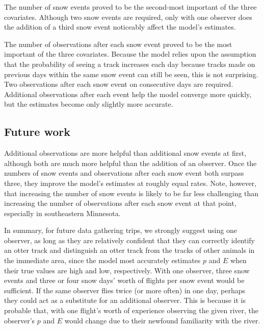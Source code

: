 \documentclass[12pt]{article}
\begin{document}
    The number of snow events proved to be the second-most important of the
    three covariates. Although two snow events are required, only with one
    observer does the addition of a third snow event noticeably affect the
    model's estimates.

    The number of observations after each snow event proved to be the most
    important of the three covariates. Because the model relies upon the
    assumption that the probability of seeing a track increases each day because
    tracks made on previous days within the same snow event can still be seen,
    this is not surprising. Two observations after each snow event on
    consecutive days are required. Additional observations after each event help
    the model converge more quickly, but the estimates become only slightly more
    accurate.

    \subsection{Future work}
    Additional observations are more helpful than additional snow events at
    first, although both are much more helpful than the addition of an observer.
    Once the numbers of snow events and observations after each snow event both
    surpass three, they improve the model's estimates at roughly equal rates.
    Note, however, that increasing the number of snow events is likely to be far
    less challenging than increasing the number of observations after each snow
    event at that point, especially in southeastern Minnesota.

    In summary, for future data gathering trips, we strongly suggest using one
    observer, as long as they are relatively confident that they can correctly
    identify an otter track and distinguish an otter track from the tracks of
    other animals in the immediate area, since the model most accurately
    estimates \(p\) and \(E\) when their true values are high and low,
    respectively. With one observer, three snow events and three or four snow
    days' worth of flights per snow event would be sufficient. If the same
    observer flies twice (or more often) in one day, perhaps they could act as a
    substitute for an additional observer. This is because it is probable that,
    with one flight's worth of experience observing the given river, the
    observer's \(p\) and \(E\) would change due to their newfound familiarity
    with the river.



\end{document}
